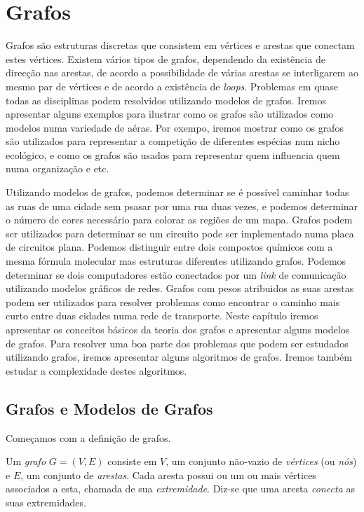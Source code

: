 \chapter{Grafos}
\label{cap:grafos}

Grafos são estruturas discretas que consistem em vértices e arestas que conectam
estes vértices. Existem vários tipos de grafos, dependendo da existência de
direcção nas arestas, de acordo a possibilidade de várias arestas se
interligarem ao mesmo par de vértices e de acordo a existência de \emph{loops}.
Problemas em quase todas as disciplinas podem resolvidos utilizando modelos de
grafos. Iremos apresentar alguns exemplos para ilustrar como os grafos são
utilizados como modelos numa variedade de aéras. Por exempo, iremos mostrar como
os grafos são utilizados para representar a competição de diferentes espécias
num nicho ecológico, e como os grafos são usados para representar quem
influencia quem numa organização e etc.

Utilizando modelos de grafos, podemos determinar se é possível caminhar todas as
ruas de uma cidade sem psasar por uma rua duas vezes, e podemos determinar o
número de cores necessário para colorar as regiões de um mapa. Grafos podem ser
utilizados para determinar se um circuito pode ser implementado numa placa de
circuitos plana. Podemos distinguir entre dois compostos químicos com a mesma
fórmula molecular mas estruturas diferentes utilizando grafos. Podemos
determinar se dois computadores estão conectados por um \emph{link} de
comunicação utilizando modelos gráficos de redes. Grafos com pesos atribuidos as
suas arestas podem ser utilizados para resolver problemas como encontrar o
caminho mais curto entre duas cidades numa rede de transporte. Neste capítulo
iremos apresentar os conceitos básicos da teoria dos grafos e apresentar alguns
modelos de grafos. Para resolver uma boa parte dos problemas que podem ser
estudados utilizando grafos, iremos apresentar alguns algoritmos de grafos.
Iremos também estudar a complexidade destes algoritmos.

\section{Grafos e Modelos de Grafos}

Começamos com a definição de grafos.
\begin{defn}
\label{def51}
Um \emph{grafo} $G = (V,E)$ consiste em $V$, um conjunto não-vazio de
\emph{vértices} (ou \emph{nós}) e $E$, um conjunto de \emph{arestas}. Cada
aresta possui ou um ou mais vértices associados a esta, chamada de sua
\emph{extremidade}. Diz-se que uma aresta \emph{conecta} as suas extremidades.
\end{defn}